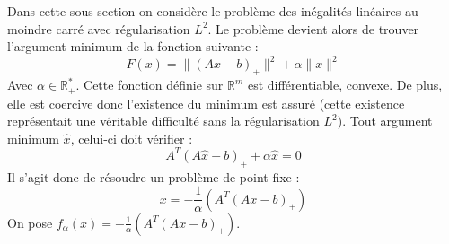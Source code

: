\documentclass[10pt,a4paper]{article}
\begin{document}
Dans cette sous section on considère le problème des inégalités linéaires au moindre carré avec régularisation $L^2$.
Le problème devient alors de trouver l'argument minimum de la fonction suivante :
\begin{equation}
F(x) = \| (Ax-b)_+ \|^2+ \alpha \| x\|^2
\end{equation}
Avec $\alpha \in \mathbb{R}_+^*$.
Cette fonction définie sur $\mathbb{R}^m$ est différentiable, convexe.
De plus, elle est coercive donc l'existence du minimum est assuré (cette existence représentait une véritable difficulté sans la régularisation $L^2$).
Tout argument minimum $\hat{x}$, celui-ci doit vérifier :
\begin{equation}
A^T(A \hat{x}-b)_+ + \alpha \hat{x}=0
\end{equation}
Il s'agit donc de résoudre un problème de point fixe :
\begin{equation}
x=-\frac{1}{\alpha}\left( A^T(Ax-b)_+\right)
\end{equation}
On pose $f_{\alpha}(x)=-\frac{1}{\alpha}\left( A^T(Ax-b)_+\right)$.
\end{document}
